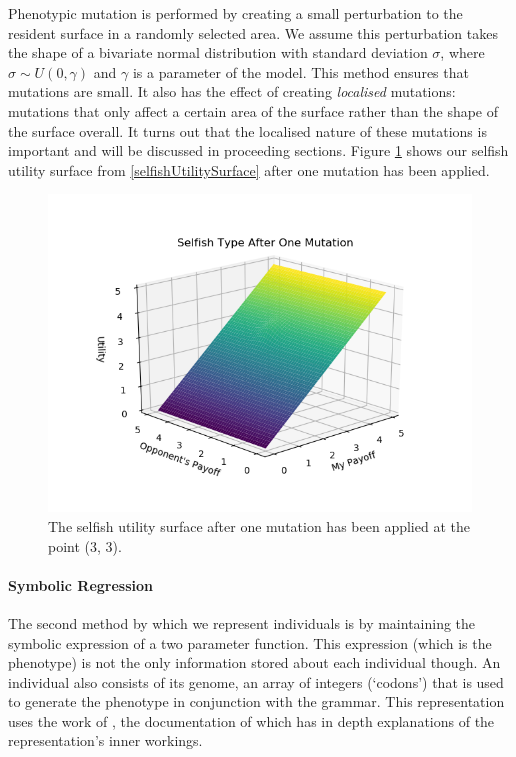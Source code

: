 \documentclass[11pt]{book}
\newcommand*{\np}{\par\noindent\newline}
\begin{document}
\np Phenotypic mutation is performed by creating a small perturbation to the resident surface in a randomly selected area.
We assume this perturbation takes the shape of a bivariate normal distribution with standard deviation $\sigma$, where $\sigma \sim U(0,\gamma)$ and $\gamma$ is a parameter of the model.
This method ensures that mutations are small.
It also has the effect of creating \textit{localised} mutations: mutations that only affect a certain area of the surface rather than the shape of the surface overall.
It turns out that the localised nature of these mutations is important and will be discussed in proceeding sections.
Figure \ref{selfishUtilitySurfaceOneMutation} shows our selfish utility surface from \ref{selfishUtilitySurface} after one mutation has been applied.
\begin{figure}
	\centering
	\includegraphics[scale=0.7]{resources/one_mutation.png}
	\caption{The selfish utility surface after one mutation has been applied at the point (3, 3).}
	\label{selfishUtilitySurfaceOneMutation}
\end{figure}
\paragraph{Symbolic Regression}
\np The second method by which we represent individuals is by maintaining the symbolic expression of a two parameter function.
This expression (which is the phenotype) is not the only information stored about each individual though.
An individual also consists of its genome, an array of integers (`codons') that is used to generate the phenotype in conjunction with the grammar.
This representation uses the work of \citet{fenton_ponyge2:_2017}, the documentation of which has in depth explanations of the representation's inner workings.
\end{document}
